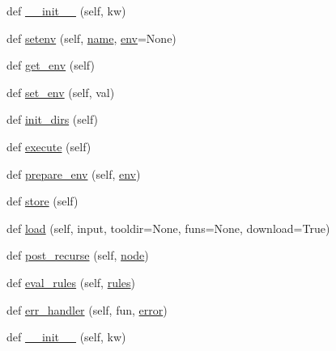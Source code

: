 \begin{DoxyCompactItemize}
def \hyperlink{classwaflib_1_1_configure_1_1_configuration_context_a0f139855aa53920d6f30a05e10253ab0}{\+\_\+\+\_\+init\+\_\+\+\_\+} (self, kw)
\item 
def \hyperlink{classwaflib_1_1_configure_1_1_configuration_context_a2ed4960105cdf08c13cd178367ae1818}{setenv} (self, \hyperlink{lib_2expat_8h_a1b49b495b59f9e73205b69ad1a2965b0}{name}, \hyperlink{classwaflib_1_1_configure_1_1_configuration_context_a390267f6d3529fe07447ffb4925ca533}{env}=None)
\item 
def \hyperlink{classwaflib_1_1_configure_1_1_configuration_context_a5f2dfad34690147826b09413246140f7}{get\+\_\+env} (self)
\item 
def \hyperlink{classwaflib_1_1_configure_1_1_configuration_context_ad30b269279dd9c24e6d892bb3b2fc583}{set\+\_\+env} (self, val)
\item 
def \hyperlink{classwaflib_1_1_configure_1_1_configuration_context_a782925b68e221c10f8e08433329364c9}{init\+\_\+dirs} (self)
\item 
def \hyperlink{classwaflib_1_1_configure_1_1_configuration_context_a2dadcc441cc31bb49159c709bae0ec32}{execute} (self)
\item 
def \hyperlink{classwaflib_1_1_configure_1_1_configuration_context_a913063288a6135c3105acf180e7f0f0c}{prepare\+\_\+env} (self, \hyperlink{classwaflib_1_1_configure_1_1_configuration_context_a390267f6d3529fe07447ffb4925ca533}{env})
\item 
def \hyperlink{classwaflib_1_1_configure_1_1_configuration_context_aadaed27da973f44dde6eaa890026be35}{store} (self)
\item 
def \hyperlink{classwaflib_1_1_configure_1_1_configuration_context_ae13e6fac1db3060edb50337f97b7be3f}{load} (self, input, tooldir=None, funs=None, download=True)
\item 
def \hyperlink{classwaflib_1_1_configure_1_1_configuration_context_a9620736938604c56dc26964b06a24e2e}{post\+\_\+recurse} (self, \hyperlink{structnode}{node})
\item 
def \hyperlink{classwaflib_1_1_configure_1_1_configuration_context_af1b5fdd6d958f8b996dba916c44ec9fa}{eval\+\_\+rules} (self, \hyperlink{classwaflib_1_1_configure_1_1_configuration_context_a279ad5a7c2630c4416afc36cad85a2db}{rules})
\item 
def \hyperlink{classwaflib_1_1_configure_1_1_configuration_context_acc349b079382fdac3d626eb46bd54b7e}{err\+\_\+handler} (self, fun, \hyperlink{sndfile__save_8m_ada4b423bc19e6ff5c5b514e55f518a82}{error})
\item 
def \hyperlink{classwaflib_1_1_configure_1_1_configuration_context_a0f139855aa53920d6f30a05e10253ab0}{\+\_\+\+\_\+init\+\_\+\+\_\+} (self, kw)

\end{DoxyCompactItemize}
